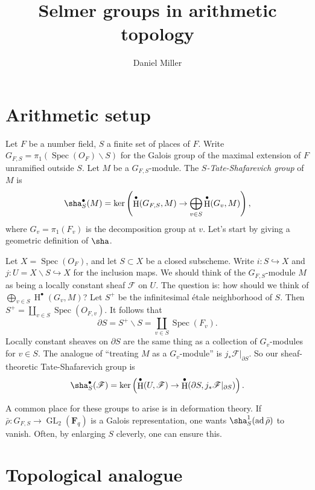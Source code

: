 \documentclass{article}
\title{Selmer groups in arithmetic topology}
\author{Daniel Miller}
\DeclareMathOperator{\adjoint}{ad}
\DeclareMathOperator{\GL}{GL}
\DeclareMathOperator{\h}{H}
\DeclareMathOperator{\spectrum}{Spec}
\newcommand{\dF}{\mathbf{F}}
\newcommand{\sF}{\mathscr{F}}
\begin{document}
\maketitle





\section{Arithmetic setup}

Let $F$ be a number field, $S$ a finite set of places of $F$. Write 
$G_{F,S}=\pi_1(\spectrum(O_F)\smallsetminus S)$ for the Galois group of the 
maximal extension of $F$ unramified outside $S$. Let $M$ be a 
$G_{F,S}$-module. The \emph{$S$-Tate-Shafarevich group} of $M$ is 
\[
  \sha_S^\bullet(M) = \ker\left(\h^\bullet(G_{F,S},M) \to \bigoplus_{v\in S} \h^\bullet(G_v,M)\right) ,
\]
where $G_v=\pi_1(F_v)$ is the decomposition group at $v$. Let's start by giving 
a geometric definition of $\sha$. 

Let $X=\spectrum(O_F)$, and let $S\subset X$ be a closed subscheme. Write 
$i:S\hookrightarrow X$ and $j:U=X\smallsetminus S\hookrightarrow X$ for the 
inclusion maps. We should think of the $G_{F,S}$-module $M$ as being a locally 
constant sheaf $\sF$ on $U$. The question is: how should we think of 
$\bigoplus_{v\in S} \h^\bullet(G_v,M)$? Let $S^+$ be the infinitesimal \'etale 
neighborhood of $S$. Then $S^+=\coprod_{v\in S} \spectrum(O_{F,v})$. It follows 
that 
\[
  \partial S = S^+\smallsetminus S = \coprod_{v\in S} \spectrum(F_v) .
\]
Locally constant sheaves on $\partial S$ are the same thing as a collection of 
$G_v$-modules for $v\in S$. The analogue of ``treating $M$ as a $G_v$-module'' 
is $j_\ast \sF|_{\partial S}$. So our sheaf-theoretic Tate-Shafarevich group is 
\[
  \sha_S^\bullet(\sF) = \ker\left(\h^\bullet(U,\sF) \to \h^\bullet(\partial S,j_\ast \sF|_{\partial S})\right) .
\]

A common place for these groups to arise is in deformation theory. If 
$\bar\rho:G_{F,S}\to \GL_2(\dF_q)$ is a Galois representation, one wants 
$\sha_S^1(\adjoint \bar\rho)$ to vanish. Often, by enlarging $S$ cleverly, one 
can ensure this. 





\section{Topological analogue}
\end{document}
